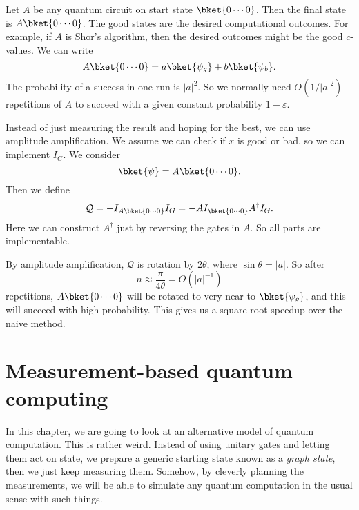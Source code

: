 \documentclass[a4paper]{article}
\begin{document}
\begin{eg}
  Let $A$ be any quantum circuit on start state $\bket{0\cdots0}$. Then the final state is $A \bket{0\cdots0}$. The good states are the desired computational outcomes. For example, if $A$ is Shor's algorithm, then the desired outcomes might be the good $c$-values. We can write
  \[
    A\bket{0\cdots0} = a \bket{\psi_g} + b \bket{\psi_b}.
  \]
  The probability of a success in one run is $|a|^2$. So we normally need $O(1/|a|^2)$ repetitions of $A$ to succeed with a given constant probability $1 - \varepsilon$.

  Instead of just measuring the result and hoping for the best, we can use amplitude amplification. We assume we can check if $x$ is good or bad, so we can implement $I_G$. We consider
  \[
    \bket{\psi} = A \bket{0\cdots0}.
  \]
  Then we define
  \[
    \mathcal{Q} = - I_{A\bket{0\cdots0}} I_G = - A I_{\bket{0\cdots0}} A^\dagger I_G.
  \]
  Here we can construct $A^\dagger$ just by reversing the gates in $A$. So all parts are implementable.

  By amplitude amplification, $\mathcal{Q}$ is rotation by $2 \theta$, where $\sin \theta = |a|$. So after
  \[
    n \approx \frac{\pi}{4 \theta} = O(|a|^{-1})
  \]
  repetitions, $A \bket{0\cdots 0}$ will be rotated to very near to $\bket{\psi_g}$, and this will succeed with high probability. This gives us a square root speedup over the naive method.
\end{eg}

\section{Measurement-based quantum computing}
In this chapter, we are going to look at an alternative model of quantum computation. This is rather weird. Instead of using unitary gates and letting them act on state, we prepare a generic starting state known as a \emph{graph state}, then we just keep measuring them. Somehow, by cleverly planning the measurements, we will be able to simulate any quantum computation in the usual sense with such things.
\end{document}

